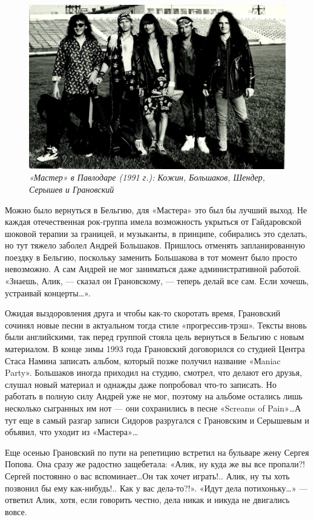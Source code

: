 \documentclass[16pt,a5paper,oneside]{book}
\begin{document}
\begin{figure}
    \centering
    \includegraphics[scale=0.8]{Image29}
    \caption{\textit{«Мастер» в Павлодаре (1991 г.): Кожин, Большаков, Шендер, Серышев и Грановский}}
\end{figure}

Можно было вернуться в Бельгию, для «Мастера» это был бы лучший выход. Не каждая отечественная рок-группа имела
возможность укрыться от Гайдаровской шоковой терапии за границей, и музыканты, в принципе, собирались это сделать, но
тут тяжело заболел Андрей Большаков. Пришлось отменять запланированную поездку в Бельгию, поскольку заменить Большакова
в тот момент было просто невозможно. А сам Андрей не мог заниматься даже административной работой. «Знаешь, Алик, —
сказал он Грановскому, — теперь делай все сам. Если хочешь, устраивай концерты\ldots».

Ожидая выздоровления друга и чтобы как-то скоротать время, Грановский сочинял новые песни в актуальном тогда стиле
«прогрессив-трэш». Тексты вновь были английскими, так перед группой стояла цель вернуться в Бельгию с новым материалом.
В конце зимы 1993 года Грановский договорился со студией Центра Стаса Намина записать альбом, который позже получил
название «Мaniac Party». Большаков иногда приходил на студию, смотрел, что делают его друзья, слушал новый материал и
однажды даже попробовал что-то записать. Но работать в полную силу Андрей уже не мог, поэтому на альбоме остались лишь
несколько сыгранных им нот — они сохранились в песне «Screams of Pain»\ldots А тут еще в самый разгар записи Сидоров
разругался с Грановским и Серышевым и объявил, что уходит из «Мастера»\ldots

Еще осенью Грановский по пути на репетицию встретил на бульваре жену Сергея Попова. Она сразу же радостно защебетала:
«Алик, ну куда же вы все пропали?! Сергей постоянно о вас вспоминает\ldots Он так хочет играть!.. Алик, ну ты хоть
позвонил бы ему как-нибудь!.. Как у вас дела-то?!». «Идут дела потихоньку\ldots» — ответил Алик, хотя, если говорить
честно, дела никак и никуда не двигались вовсе.
\end{document}

